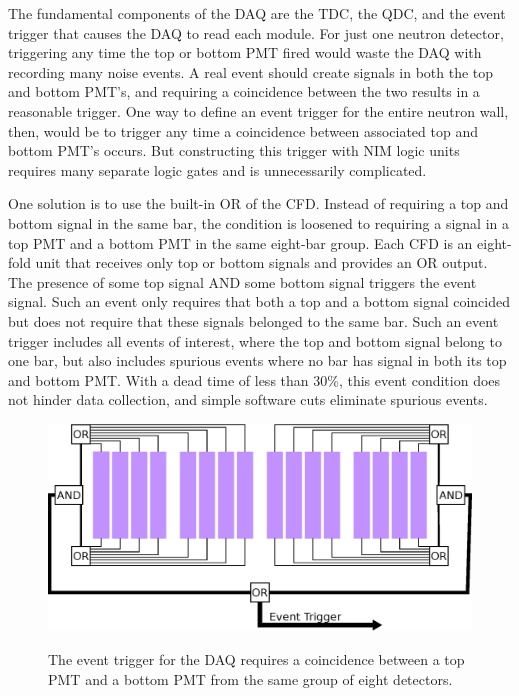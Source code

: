 The fundamental components of the DAQ are the TDC, the QDC, and the event trigger that causes the DAQ to read each module.  For just one neutron detector, triggering any time the top or bottom PMT fired would waste the DAQ with recording many noise events.  A real event should create signals in both the top and bottom PMT's, and requiring a coincidence between the two results in a reasonable trigger.  One way to define an event trigger for the entire neutron wall, then, would be to trigger any time a coincidence between associated top and bottom PMT's occurs.  But constructing this trigger with NIM logic units requires many separate logic gates and is unnecessarily complicated.  

One solution is to use the built-in OR of the CFD.  Instead of requiring a top and bottom signal in the same bar, the condition is loosened to requiring a signal in a top PMT and a bottom PMT in the same eight-bar group.  Each CFD is an eight-fold unit that receives only top or bottom signals and provides an OR output.  The presence of some top signal AND some bottom signal triggers the event signal.  Such an event only requires that both a top and a bottom signal coincided but does not require that these signals belonged to the same bar.  Such an event trigger includes all events of interest, where the top and bottom signal belong to one bar, but also includes spurious events where no bar has signal in both its top and bottom PMT.  With a dead time of less than 30\%, this event condition does not hinder data collection, and simple software cuts eliminate spurious events.

\begin{figure}[htp]
\centering
\includegraphics[width=1.0\textwidth]{figures/event_trigger.eps}
\label{fig:eventTrig}
\caption{The event trigger for the DAQ requires a coincidence between a top PMT and a bottom PMT from the same group of eight detectors.}
\end{figure}

